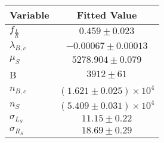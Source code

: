 \begin{tabular}[t]{lc}
\hline
Variable &Fitted Value\\
\hline\hline
$f_{\frac{L}{R}}$&$0.459\pm0.023$\\
\hline
$\lambda_{B,c}$&$-0.00067\pm0.00013$\\
\hline
$\mu_S$&$5278.904\pm0.079$\\
\hline
B&$3912\pm61$\\
\hline
$n_{B,c}$&$(1.621\pm0.025)\times 10^4$\\
\hline
$n_S$&$(5.409\pm0.031)\times 10^4$\\
\hline
$\sigma_{L_S}$&$11.15\pm0.22$\\
\hline
$\sigma_{R_S}$&$18.69\pm0.29$\\
\hline
\end{tabular}